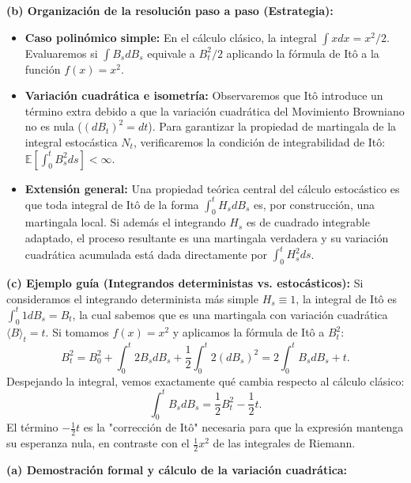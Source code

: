\documentclass[11pt, letterpaper]{article}
\begin{document}
\begin{solucion}
    \textbf{(b) Organización de la resolución paso a paso (Estrategia):}
    \begin{itemize}
        \item[(i)] \textbf{Caso polinómico simple:} En el cálculo clásico, la integral $\int x dx = x^2/2$. Evaluaremos si $\int B_s dB_s$ equivale a $B_t^2/2$ aplicando la fórmula de Itô a la función $f(x) = x^2$. 
        \item[(ii)] \textbf{Variación cuadrática e isometría:} Observaremos que Itô introduce un término extra debido a que la variación cuadrática del Movimiento Browniano no es nula ($(dB_t)^2 = dt$). Para garantizar la propiedad de martingala de la integral estocástica $N_t$, verificaremos la condición de integrabilidad de Itô: $\mathbb{E}[\int_0^t B_s^2 ds] < \infty$.
        \item[(iii)] \textbf{Extensión general:} Una propiedad teórica central del cálculo estocástico es que toda integral de Itô de la forma $\int_0^t H_s dB_s$ es, por construcción, una martingala local. Si además el integrando $H_s$ es de cuadrado integrable adaptado, el proceso resultante es una martingala verdadera y su variación cuadrática acumulada está dada directamente por $\int_0^t H_s^2 ds$.
    \end{itemize}

    \vspace{3mm}
    \textbf{(c) Ejemplo guía (Integrandos deterministas vs. estocásticos):}
    Si consideramos el integrando determinista más simple $H_s \equiv 1$, la integral de Itô es $\int_0^t 1 dB_s = B_t$, la cual sabemos que es una martingala con variación cuadrática $\langle B \rangle_t = t$.
    Si tomamos $f(x) = x^2$ y aplicamos la fórmula de Itô a $B_t^2$:
    \[ B_t^2 = B_0^2 + \int_0^t 2B_s dB_s + \frac{1}{2} \int_0^t 2 (dB_s)^2 = 2 \int_0^t B_s dB_s + t. \]
    Despejando la integral, vemos exactamente qué cambia respecto al cálculo clásico:
    \[ \int_0^t B_s dB_s = \frac{1}{2}B_t^2 - \frac{1}{2}t. \]
    El término $-\frac{1}{2}t$ es la "corrección de Itô" necesaria para que la expresión mantenga su esperanza nula, en contraste con el $\frac{1}{2}x^2$ de las integrales de Riemann.

    \vspace{3mm}
    \textbf{(a) Demostración formal y cálculo de la variación cuadrática:}


\end{solucion}
\end{document}
